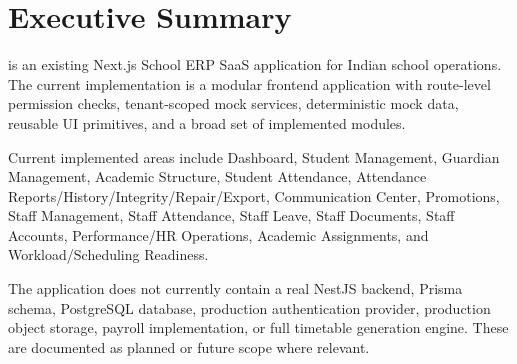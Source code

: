 \chapter*{Executive Summary}
\ProjectName{} is an existing Next.js School ERP SaaS application for Indian school operations. The current implementation is a modular frontend application with route-level permission checks, tenant-scoped mock services, deterministic mock data, reusable UI primitives, and a broad set of implemented modules.

Current implemented areas include Dashboard, Student Management, Guardian Management, Academic Structure, Student Attendance, Attendance Reports/History/Integrity/Repair/Export, Communication Center, Promotions, Staff Management, Staff Attendance, Staff Leave, Staff Documents, Staff Accounts, Performance/HR Operations, Academic Assignments, and Workload/Scheduling Readiness.

The application does not currently contain a real NestJS backend, Prisma schema, PostgreSQL database, production authentication provider, production object storage, payroll implementation, or full timetable generation engine. These are documented as planned or future scope where relevant.
